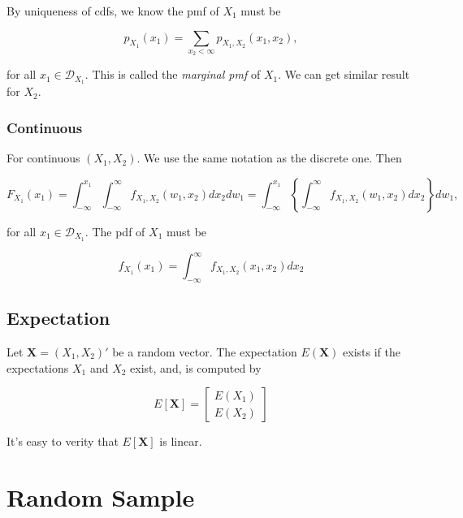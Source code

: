 \documentclass{article}
\begin{document}
                By uniqueness of cdfs, we know the pmf of $ X_{1} $ must be

                \begin{equation*}
                     p_{X_{1}}(x_{1}) = \sum_{x_{2} < \infty} p_{X_{1}, X_{2}} (x_{1}, x_{2}),
                \end{equation*}

                for all $ x_{1} \in \mathcal{D}_{X_{1}} $. This is called the \textit{marginal pmf} of $ X_{1} $.
                We can get similar result for $ X_{2} $.

            \subsubsection{Continuous}

                For continuous $ (X_{1}, X_{2}) $. We use the same notation as the discrete one. Then

                \begin{equation*}
                    F_{X_{1}} (x_{1}) = \int_{ -\infty }^{ x_{1} } \int_{
                        -\infty }^{ \infty } f_{X_{1}, X_{2}} (w_{1}, x_{2}) d x_{2} d w_{1}
                        = \int_{ -\infty }^{ x_{1} } \left\{
                            \int_{ -\infty }^{ \infty } f_{X_{1}, X_{2}} (w_{1}, x_{2}) d x_{2}
                            \right\} d w_{1},
                \end{equation*}

                for all $ x_{1} \in \mathcal{D}_{X_{1}} $. The pdf of $ X_{1} $ must be

                \begin{equation*}
                     f_{X_{1}}(x_{1}) = \int_{ -\infty }^{ \infty } f_{X_{1}, X_{2}} (x_{1}, x_{2}) d x_{2}
                \end{equation*}

            \subsection{Expectation}

                Let $ \mathbf{X} = (X_{1}, X_{2})' $ be a random vector. The
                expectation $ E( \mathbf{X} ) $ exists if the expectations $
                X_{1} $ and $ X_{2} $ exist, and, is computed by

                \begin{equation*}
                    E[ \mathbf{X} ] = \left[ \begin{array}{l}
                            E( X_{1} ) \\
                            E( X_{2} )
                    \end{array} \right]
                \end{equation*}

                It's easy to verity that $ E[ \mathbf{X} ] $ is linear.

    \section{Random Sample}
\end{document}
